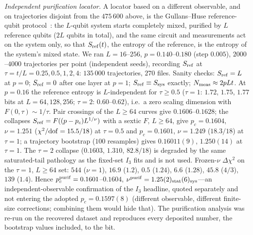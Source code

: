 \documentclass[aps,prx,reprint,superscriptaddress,nobibnotes,longbibliography]{revtex4-2}
\theoremstyle{remark}
\begin{document}
\emph{Independent purification locator.}  A locator based on a different observable, and on trajectories disjoint from the $475\,600$ above, is the Gullans--Huse reference-qubit protocol~\cite{Gullans2020}: the $L$-qubit system starts completely mixed, purified by $L$ reference qubits ($2L$ qubits in total), and the same circuit and measurements act on the system only, so that $S_{\rm ref}(t)$, the entropy of the reference, is the entropy of the system's mixed state.  We ran $L=16$--$256$, $p=0.140$--$0.180$ (step $0.005$), $2000$--$4000$ trajectories per point (independent seeds), recording $S_{\rm ref}$ at $\tau=t/L=0.25,0.5,1,2,4$: $135\,000$ trajectories, $270$ files.  Sanity checks: $S_{\rm ref}=L$ at $p=0$; $S_{\rm ref}=0$ after one layer at $p=1$; $S_{\rm ref}\equiv S_{\rm sys}$ exactly; $N_{\rm meas}\approx2pLt$.  At $p=0.16$ the reference entropy is $L$-independent for $\tau\ge0.5$ ($\tau=1$: $1.72$, $1.75$, $1.77$ bits at $L=64,128,256$; $\tau=2$: $0.60$--$0.62$), i.e.\ a zero scaling dimension with $F(0,\tau)\sim1/\tau$.  Pair crossings of the $L\ge64$ curves give $0.1606$--$0.1628$; the collapses $S_{\rm ref}=F((p-p_c)L^{1/\nu})$ with a sextic $F$, $L\ge64$, give $p_c=0.1604$, $\nu=1.251$ ($\chi^2/{\rm dof}=15.5/18$) at $\tau=0.5$ and $p_c=0.1601$, $\nu=1.249$ ($18.3/18$) at $\tau=1$; a trajectory bootstrap ($100$ resamples) gives $0.16011(9)$, $1.250(14)$ at $\tau=1$.  The $\tau=2$ collapse ($0.1603$, $1.310$, $82.8/18$) is degraded by the same saturated-tail pathology as the fixed-set $I_3$ fits and is not used.  Frozen-$\nu$ $\Delta\chi^2$ on the $\tau=1$, $L\ge64$ set: $544$ ($\nu=1$), $16.9$ ($1.2$), $0.5$ ($1.24$), $6.6$ ($1.28$), $45.8$ ($4/3$), $139$ ($1.4$).  Hence $p_c^{\rm purif}=0.1601$--$0.1604$, $\nu^{\rm purif}=1.25(2)_{\rm stat}(6)_{\rm sys}$---an independent-observable confirmation of the $I_3$ headline, quoted separately and not entering the adopted $p_c=0.1597(8)$ (different observable, different finite-size corrections; combining them would hide that).  The purification analysis was re-run on the recovered dataset and reproduces every deposited number, the bootstrap values included, to the bit.
\end{document}
